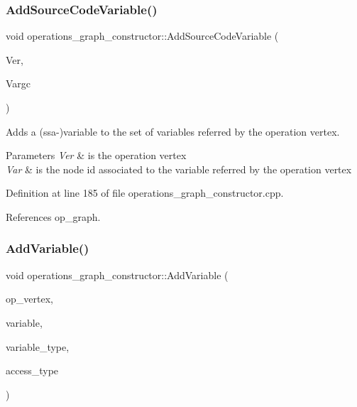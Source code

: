 \subsubsection{\texorpdfstring{Add\+Source\+Code\+Variable()}{AddSourceCodeVariable()}}
{\footnotesize\ttfamily void operations\+\_\+graph\+\_\+constructor\+::\+Add\+Source\+Code\+Variable (\begin{DoxyParamCaption}\item[{const \hyperlink{graph_8hpp_abefdcf0544e601805af44eca032cca14}{vertex} \&}]{Ver,  }\item[{unsigned int}]{Vargc }\end{DoxyParamCaption})}



Adds a (ssa-\/)variable to the set of variables referred by the operation vertex. 


\begin{DoxyParams}{Parameters}
{\em Ver} & is the operation vertex \\
\hline
{\em Var} & is the node id associated to the variable referred by the operation vertex \\
\hline
\end{DoxyParams}


Definition at line 185 of file operations\+\_\+graph\+\_\+constructor.\+cpp.



References op\+\_\+graph.

\mbox{\label{classoperations__graph__constructor_a4595ce68ba2e97a11b8c2111ff81c7c6}} 
\subsubsection{\texorpdfstring{Add\+Variable()}{AddVariable()}}
{\footnotesize\ttfamily void operations\+\_\+graph\+\_\+constructor\+::\+Add\+Variable (\begin{DoxyParamCaption}\item[{const \hyperlink{graph_8hpp_abefdcf0544e601805af44eca032cca14}{vertex}}]{op\+\_\+vertex,  }\item[{const unsigned int}]{variable,  }\item[{const \hyperlink{function__behavior_8hpp_aff0ab7827d49a7aca1f277e0ff126755}{Function\+Behavior\+\_\+\+Variable\+Type}}]{variable\+\_\+type,  }\item[{const \hyperlink{function__behavior_8hpp_a68c28bfcfefbe63cece191e941af0409}{Function\+Behavior\+\_\+\+Variable\+Access\+Type}}]{access\+\_\+type }\end{DoxyParamCaption})}



